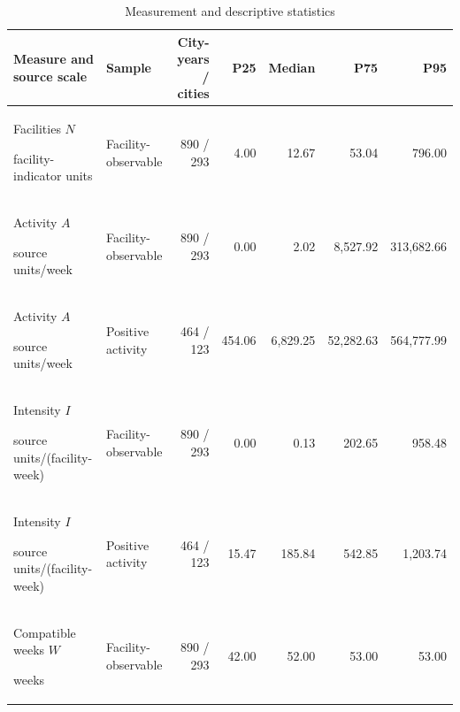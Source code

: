 \begin{table}[htbp]\centering\small\setlength{\tabcolsep}{4.5pt}\caption{Measurement and descriptive statistics}\label{tab:sources}
\begin{tabular}{@{}p{35mm}p{27mm}rrrrr@{}}\toprule
Measure and source scale & Sample & City-years / cities & P25 & Median & P75 & P95\\
\midrule
Facilities $N$\par facility-indicator units & Facility-observable & 890 / 293 & 4.00 & 12.67 & 53.04 & 796.00\\
Activity $A$\par source units/week & Facility-observable & 890 / 293 & 0.00 & 2.02 & 8,527.92 & 313,682.66\\
Activity $A$\par source units/week & Positive activity & 464 / 123 & 454.06 & 6,829.25 & 52,282.63 & 564,777.99\\
Intensity $I$\par source units/(facility-week) & Facility-observable & 890 / 293 & 0.00 & 0.13 & 202.65 & 958.48\\
Intensity $I$\par source units/(facility-week) & Positive activity & 464 / 123 & 15.47 & 185.84 & 542.85 & 1,203.74\\
Compatible weeks $W$\par weeks & Facility-observable & 890 / 293 & 42.00 & 52.00 & 53.00 & 53.00\\
\bottomrule\end{tabular}\end{table}
